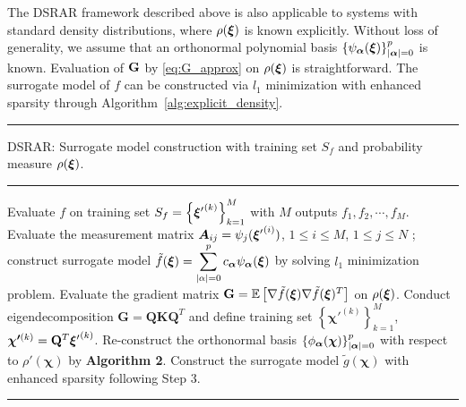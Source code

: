 The \ac{DSRAR} framework described above is also applicable to systems with 
standard density distributions, where $\rho(\bm\xi)$ is known explicitly.
Without loss of generality, we assume that an orthonormal polynomial basis $\left\{ \psi_{\bm\alpha}(\bm\xi)\right\}_{\vert \bm\alpha \vert = 0}^p$ is known.
Evaluation of $\mathbf G$ by \eqref{eq:G_approx} on $\rho(\bm\xi)$ is straightforward.
The surrogate model of $f$ can be constructed via $l_1$ minimization with enhanced sparsity through Algorithm~\ref{alg:explicit_density}.

\begin{algorithm}
  \hrule
  \caption{\ac{DSRAR}: Surrogate model construction with training set $S_f$ and probability measure $\rho(\bm\xi)$.}
  \vspace{5pt} \hrule \vspace{5pt}
  \begin{algorithmic}[1]
    \State Evaluate $f$ on training set $S_f = \left\{{\bm\xi'}^{(k)}\right\}_{k = 1}^{M}$ with $M$ outputs $f_1, f_2, \cdots, f_M$.
    \State Evaluate the measurement matrix ${\bm A}_{ij} = \psi_{j}({\bm\xi'}^{(i)})$, $1\le i\le M$, $1\le j \le N$ ; construct surrogate model $\tilde{f}(\bm\xi) = \displaystyle \sum_{\vert \alpha\vert = 0}^{p} c_{\bm \alpha} \psi_{\bm \alpha}(\bm\xi)$ by solving $l_1$ minimization problem.
    \State Evaluate the gradient matrix $ \mathbf{G}  = \mathbb{E}\left[\nabla \tilde{f}(\bm\xi) \nabla \tilde{f} (\bm\xi)^T \right ]$ on $\rho(\bm\xi)$.
    Conduct eigendecomposition $\mathbf{G} = \mathbf{Q} \mathbf{K}\mathbf{Q}^T$ and define training set $\left\{\bm{\chi'}^{(k)}\right\}_{k=1}^{M}$, $\bm{\chi'}^{(k)} = \mathbf{Q}^T {\bm\xi'}^{(k)}$.
    \State Re-construct the orthonormal  basis $\left\{ \phi_{\bm\alpha}(\bm\chi)\right\}_{\vert \bm\alpha \vert = 0}^p$ with respect to $\rho'(\bm\chi)$ by \textbf{Algorithm 2}.
    Construct the surrogate model $\tilde{g}(\bm\chi)$ with enhanced sparsity following Step 3.
  \end{algorithmic}
  \hrule
  \label{alg:explicit_density}
\end{algorithm}

